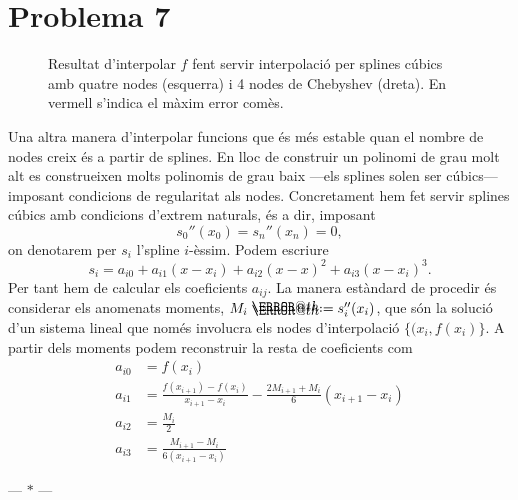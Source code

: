 \documentclass[12pt]{article}
\makeatletter
\numberwithin{table}{section}
\numberwithin{figure}{section}
\numberwithin{equation}{section}
\newcommand{\parbreak}{
	\begin{center}
		--- $\ast$ ---
	\end{center} 
}
\newcommand*{\defeq}{\mathrel{\rlap{%
    \raisebox{0.3ex}{$\m@th\cdot$}}%
  \raisebox{-0.3ex}{$\m@th\cdot$}}%
=}
\makeatother
\begin{document}
\newpage
\section{Problema 7}
\begin{figure}[b]
	\centering
	\sffamily \footnotesize
	
	\caption{Resultat d'interpolar \( f \) fent servir interpolació per splines cúbics amb quatre nodes (esquerra) i 4 nodes de Chebyshev (dreta). En vermell s'indica el màxim error comès.}
	\label{fig:splines}	
\end{figure}

Una altra manera d'interpolar funcions que és més estable quan el nombre de nodes creix és a partir de splines. En lloc de construir un polinomi de grau molt alt es construeixen molts polinomis de grau baix ---els splines solen ser cúbics--- imposant condicions de regularitat als nodes. Concretament hem fet servir splines cúbics amb condicions d'extrem naturals, és a dir, imposant
\begin{equation*}
	s_0''(x_0) = s_n''(x_n) = 0,
\end{equation*}
on denotarem per \( s_i \) l'spline \( i \)-èssim. Podem escriure
\begin{equation*}
	s_i = a_{i0} + a_{i1}(x-x_i) + a_{i2}(x-x)^2 + a_{i3}(x-x_i)^3.
\end{equation*}
Per tant hem de calcular els coeficients \( a_{ij} \). La manera estàndard de procedir és considerar els anomenats moments, \( M_i \defeq s_i''(x_i) \), que són la solució d'un sistema lineal que només involucra els nodes d'interpolació \( \{(x_i,f(x_i)\} \). A partir dels moments podem reconstruir la resta de coeficients com
\begin{equation} \label{eq:coeficients splines}
\begin{aligned}
	a_{i0} & = f(x_i) \\
	a_{i1} & = \frac{f(x_{i+1}) - f(x_i)}{x_{i+1} - x_i} - \frac{2M_{i+1} + M_i}{6}(x_{i+1} - x_i) \\
	a_{i2} & = \frac{M_i}{2} \\
	a_{i3} & = \frac{M_{i+1} - M_i}{6(x_{i+1} - x_i)}
\end{aligned} 
\end{equation}

\parbreak
\end{document}
